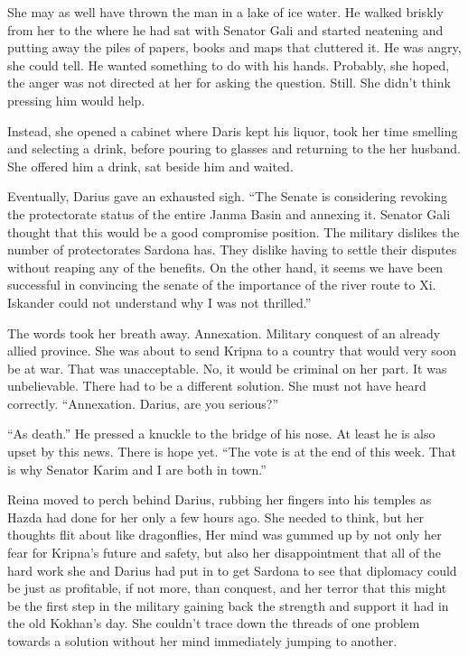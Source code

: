 \documentclass{article}
\begin{document}
	She may as well have thrown the man in a lake of ice water. He walked briskly from her to the where he had sat with Senator Gali and started neatening and putting away the piles of papers, books and maps that cluttered it. He was angry, she could tell. He wanted something to do with his hands. Probably, she hoped, the anger was not directed at her for asking the question. Still. She didn’t think pressing him would help. 
	
	Instead, she opened a cabinet where Daris kept his liquor, took her time smelling and selecting a drink, before pouring to glasses and returning to the her husband. She offered him a drink, sat beside him and waited.
	
	Eventually, Darius gave an exhausted sigh. “The Senate is considering revoking the protectorate status of the entire Janma Basin and annexing it. Senator Gali thought that this would be a good compromise position. The military dislikes the number of protectorates Sardona has. They dislike having to settle their disputes without reaping any of the benefits. On the other hand, it seems we have been successful in convincing the senate of the importance of the river route to Xi. Iskander could not understand why I was not thrilled.” 
	
	The words took her breath away. Annexation. Military conquest of an already allied province. She was about to send Kripna to a country that would very soon be at war. That was unacceptable. No, it would be criminal on her part. It was unbelievable. There had to be a different solution. She must not have heard correctly. “Annexation. Darius, are you serious?”
	
	“As death.” He pressed a knuckle to the bridge of his nose. At least he is also upset by this news. There is hope yet. “The vote is at the end of this week. That is why Senator Karim and I are both in town.”
	
	Reina moved to perch behind Darius, rubbing her fingers into his temples as Hazda had done for her only a few hours ago. She needed to think, but her thoughts flit about like dragonflies, Her mind was gummed up by not only her fear for Kripna’s future and safety, but also her disappointment that all of the hard work she and Darius had put in to get Sardona to see that diplomacy could be just as profitable, if not more, than conquest, and her terror that this might be the first step in the military gaining back the strength and support it had in the old Kokhan’s day. She couldn’t trace down the threads of one problem towards a solution without her mind immediately jumping to another.
	
\end{document}
